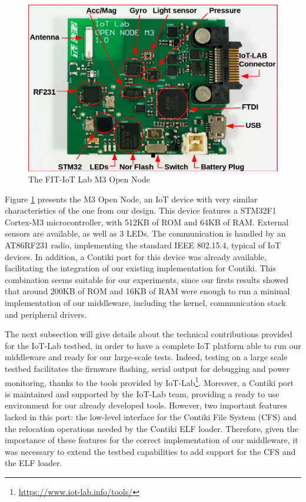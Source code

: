 \begin{figure}[htb]
	\centering
	\includegraphics[width=0.7\columnwidth]{chapters/intra-node.images/m3opennode.png}
	\caption{The FIT-IoT Lab M3 Open Node} \label{fig:M3OpenNode}
\end{figure}

Figure \ref{fig:M3OpenNode} presents the M3 Open Node, an IoT device with very similar characteristics of the one from our design.
This device features a STM32F1 Cortex-M3 microcontroller, with 512KB of ROM and 64KB of RAM.
External sensors are available, as well as 3 LEDs.
The communication is handled by an AT86RF231 radio, implementing the standard IEEE 802.15.4, typical of IoT devices.
In addition, a Contiki port for this device was already available, facilitating the integration of our existing implementation for Contiki.
This combination seems suitable for our experiments, since our firsts results showed that around 200KB of ROM and 16KB of RAM were enough to run a minimal implementation of our middleware, including the kernel, communication stack and peripheral drivers.

The next subsection will give details about the technical contributions provided for the IoT-Lab testbed, in order to have a complete IoT platform able to run our middleware and ready for our large-scale tests.
Indeed, testing on a large scale testbed facilitates the firmware flashing, serial output for debugging and power monitoring, thanks to the tools provided by IoT-Lab\footnote{\url{https://www.iot-lab.info/tools/}}.
Moreover, a Contiki port is maintained and supported by the IoT-Lab team, providing a ready to use environment for our already developed tools.
However, two important features lacked in this port: the low-level interface for the Contiki File System (CFS) and the relocation operations needed by the Contiki ELF loader.
Therefore, given the importance of these features for the correct implementation of our middleware, it was necessary to extend the testbed capabilities to add support for the CFS and the ELF loader.


